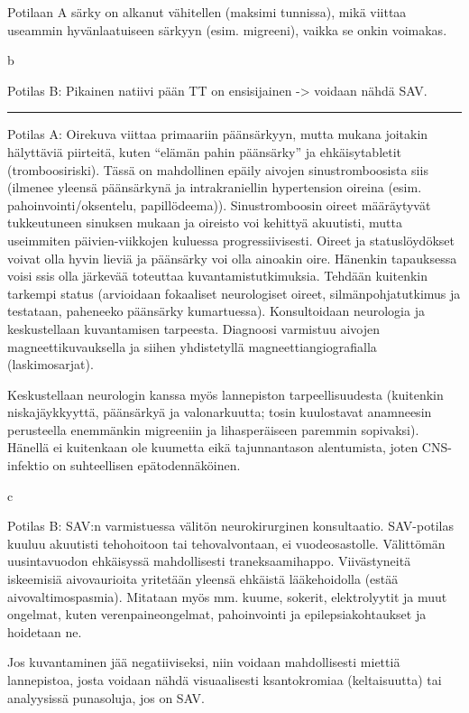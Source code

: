 \documentclass[
]{book}
\begin{document}
Potilaan A särky on alkanut vähitellen (maksimi tunnissa), mikä viittaa useammin hyvänlaatuiseen särkyyn (esim. migreeni), vaikka se onkin voimakas.

b

Potilas B: Pikainen natiivi pään TT on ensisijainen -\textgreater{} voidaan nähdä SAV.

\begin{center}\rule{0.5\linewidth}{0.5pt}\end{center}

Potilas A: Oirekuva viittaa primaariin päänsärkyyn, mutta mukana joitakin hälyttäviä piirteitä, kuten ``elämän pahin päänsärky'' ja ehkäisytabletit (tromboosiriski). Tässä on mahdollinen epäily aivojen sinustromboosista siis (ilmenee yleensä päänsärkynä ja intrakraniellin hypertension oireina (esim. pahoinvointi/oksentelu, papillödeema)). Sinustromboosin oireet määräytyvät tukkeutuneen sinuksen mukaan ja oireisto voi kehittyä akuutisti, mutta useimmiten päivien-viikkojen kuluessa progressiivisesti. Oireet ja statuslöydökset voivat olla hyvin lieviä ja päänsärky voi olla ainoakin oire. Hänenkin tapauksessa voisi ssis olla järkevää toteuttaa kuvantamistutkimuksia. Tehdään kuitenkin tarkempi status (arvioidaan fokaaliset neurologiset oireet, silmänpohjatutkimus ja testataan, paheneeko päänsärky kumartuessa). Konsultoidaan neurologia ja keskustellaan kuvantamisen tarpeesta. Diagnoosi varmistuu aivojen magneettikuvauksella ja siihen yhdistetyllä magneettiangiografialla (laskimosarjat).

Keskustellaan neurologin kanssa myös lannepiston tarpeellisuudesta (kuitenkin niskajäykkyyttä, päänsärkyä ja valonarkuutta; tosin kuulostavat anamneesin perusteella enemmänkin migreeniin ja lihasperäiseen paremmin sopivaksi). Hänellä ei kuitenkaan ole kuumetta eikä tajunnantason alentumista, joten CNS-infektio on suhteellisen epätodennäköinen.

c

Potilas B: SAV:n varmistuessa välitön neurokirurginen konsultaatio. SAV-potilas kuuluu akuutisti tehohoitoon tai tehovalvontaan, ei vuodeosastolle. Välittömän uusintavuodon ehkäisyssä mahdollisesti traneksaamihappo. Viivästyneitä iskeemisiä aivovaurioita yritetään yleensä ehkäistä lääkehoidolla (estää aivovaltimospasmia). Mitataan myös mm. kuume, sokerit, elektrolyytit ja muut ongelmat, kuten verenpaineongelmat, pahoinvointi ja epilepsiakohtaukset ja hoidetaan ne.

Jos kuvantaminen jää negatiiviseksi, niin voidaan mahdollisesti miettiä lannepistoa, josta voidaan nähdä visuaalisesti ksantokromiaa (keltaisuutta) tai analyysissä punasoluja, jos on SAV.
\end{document}
